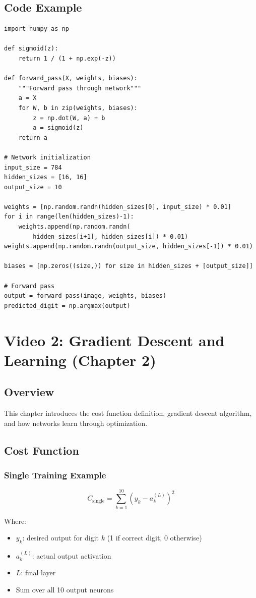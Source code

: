 \documentclass[11pt,a4paper]{article}
\begin{document}
\subsection{Code Example}
\begin{lstlisting}
import numpy as np

def sigmoid(z):
    return 1 / (1 + np.exp(-z))

def forward_pass(X, weights, biases):
    """Forward pass through network"""
    a = X
    for W, b in zip(weights, biases):
        z = np.dot(W, a) + b
        a = sigmoid(z)
    return a

# Network initialization
input_size = 784
hidden_sizes = [16, 16]
output_size = 10

weights = [np.random.randn(hidden_sizes[0], input_size) * 0.01]
for i in range(len(hidden_sizes)-1):
    weights.append(np.random.randn(
        hidden_sizes[i+1], hidden_sizes[i]) * 0.01)
weights.append(np.random.randn(output_size, hidden_sizes[-1]) * 0.01)

biases = [np.zeros((size,)) for size in hidden_sizes + [output_size]]

# Forward pass
output = forward_pass(image, weights, biases)
predicted_digit = np.argmax(output)
\end{lstlisting}

\newpage

\section{Video 2: Gradient Descent and Learning (Chapter 2)}

\subsection{Overview}
This chapter introduces the cost function definition, gradient descent algorithm, and how networks learn through optimization.

\subsection{Cost Function}

\subsubsection{Single Training Example}
\[
C_{\text{single}} = \sum_{k=1}^{10} (y_k - a_k^{(L)})^2
\]

Where:
\begin{itemize}
    \item $y_k$: desired output for digit $k$ (1 if correct digit, 0 otherwise)
    \item $a_k^{(L)}$: actual output activation
    \item $L$: final layer
    \item Sum over all 10 output neurons
\end{itemize}
\end{document}
